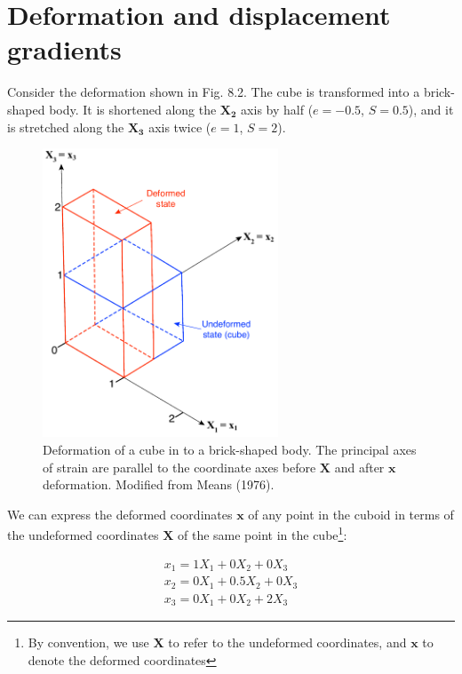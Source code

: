 \documentclass[a4paper , 12pt]{book}
\begin{document}
\section{Deformation and displacement gradients}

Consider the deformation shown in Fig. 8.2. The cube is transformed into a brick-shaped body. It is shortened along the $\mathbf{X_2}$ axis by half ($e = -0.5$, $S = 0.5$), and it is stretched along the $\mathbf{X_3}$ axis twice ($e = 1$, $S = 2$). 

\begin{figure}[ht]
    \centering
    \includegraphics[width=7.0cm]{ch8f2.pdf}
    \caption{Deformation of a cube in to a brick-shaped body. The principal axes of strain are parallel to the coordinate axes before $\mathbf{X}$ and after $\mathbf{x}$ deformation. Modified from Means (1976).}
    \label{fig8.2}
\end{figure}

We can express the deformed coordinates $\mathbf{x}$ of any point in the cuboid in terms of the undeformed coordinates $\mathbf{X}$ of the same point in the cube\footnote{By convention, we use $\mathbf{X}$ to refer to the undeformed coordinates, and $\mathbf{x}$ to denote the deformed coordinates}:

\begin{equation}
    \begin{gathered}
        x_1 = 1 X_1 + 0 X_2 + 0 X_3 \\
        x_2 = 0 X_1 + 0.5 X_2 + 0 X_3 \\
        x_3 = 0 X_1 + 0 X_2 + 2 X_3
    \end{gathered}
\end{equation}
\end{document}
